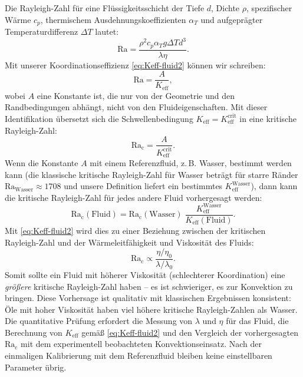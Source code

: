 \documentclass[12pt,a4paper]{article}
\begin{document}
	Die Rayleigh-Zahl für eine Flüssigkeitsschicht der Tiefe \(d\), Dichte \(\rho\), spezifischer Wärme \(c_p\), thermischem Ausdehnungskoeffizienten \(\alpha_T\) und aufgeprägter Temperaturdifferenz \(\Delta T\) lautet:
	\begin{equation}
		\mathrm{Ra} = \frac{\rho^2 c_p \alpha_T g \Delta T d^3}{\lambda \eta}.
	\end{equation}
	Mit unserer Koordinationseffizienz \eqref{eq:Keff-fluid2} können wir schreiben:
	\begin{equation}
		\mathrm{Ra} = \frac{A}{K_{\mathrm{eff}}},
	\end{equation}
	wobei \(A\) eine Konstante ist, die nur von der Geometrie und den Randbedingungen abhängt, nicht von den Fluideigenschaften. Mit dieser Identifikation übersetzt sich die Schwellenbedingung \(K_{\mathrm{eff}} = K_{\mathrm{eff}}^{\mathrm{crit}}\) in eine kritische Rayleigh-Zahl:
	\begin{equation}\label{eq:Racrit}
		\mathrm{Ra_c} = \frac{A}{K_{\mathrm{eff}}^{\mathrm{crit}}}.
	\end{equation}
	Wenn die Konstante \(A\) mit einem Referenzfluid, z. B. Wasser, bestimmt werden kann (die klassische kritische Rayleigh-Zahl für Wasser beträgt für starre Ränder \(\mathrm{Ra}_{\mathrm{Wasser}} \approx 1708\) und unsere Definition liefert ein bestimmtes \(K_{\mathrm{eff}}^{\mathrm{Wasser}}\)), dann kann die kritische Rayleigh-Zahl für jedes andere Fluid vorhergesagt werden:
	\begin{equation}\label{eq:Racrit-predict}
		\boxed{ \mathrm{Ra_c}(\text{Fluid}) = \mathrm{Ra_c}(\text{Wasser}) \;
			\frac{K_{\mathrm{eff}}^{\mathrm{Wasser}}}{K_{\mathrm{eff}}(\text{Fluid})} }.
	\end{equation}
	Mit \eqref{eq:Keff-fluid2} wird dies zu einer Beziehung zwischen der kritischen Rayleigh-Zahl und der Wärmeleitfähigkeit und Viskosität des Fluids:
	\begin{equation}
		\mathrm{Ra_c} \propto \frac{\eta / \eta_0}{\lambda / \lambda_0}.
	\end{equation}
	Somit sollte ein Fluid mit höherer Viskosität (schlechterer Koordination) eine \emph{größere} kritische Rayleigh-Zahl haben – es ist schwieriger, es zur Konvektion zu bringen. Diese Vorhersage ist qualitativ mit klassischen Ergebnissen konsistent: Öle mit hoher Viskosität haben viel höhere kritische Rayleigh-Zahlen als Wasser. Die quantitative Prüfung erfordert die Messung von \(\lambda\) und \(\eta\) für das Fluid, die Berechnung von \(K_{\mathrm{eff}}\) gemäß \eqref{eq:Keff-fluid2} und den Vergleich der vorhergesagten \(\mathrm{Ra_c}\) mit dem experimentell beobachteten Konvektionseinsatz. Nach der einmaligen Kalibrierung mit dem Referenzfluid bleiben keine einstellbaren Parameter übrig.
	
\end{document}

